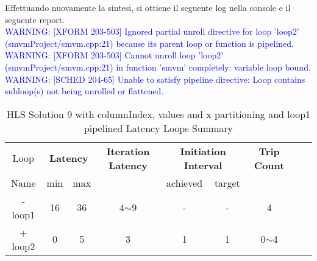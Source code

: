 

Effettuando nuovamente la sintesi, si ottiene il seguente log nella console e il seguente report.
\\
\textcolor{blue}{WARNING: [XFORM 203-503] Ignored partial unroll directive for loop 'loop2' (smvmProject/smvm.cpp:21) because its parent loop or function is pipelined.}
\\
\textcolor{blue}{WARNING: [XFORM 203-503] Cannot unroll loop 'loop2' (smvmProject/smvm.cpp:21) in function 'smvm' completely: variable loop bound.}
\\
\textcolor{blue}{WARNING: [SCHED 204-65] Unable to satisfy pipeline directive: Loop contains subloop(s) not being unrolled or flattened.}
\\
\begin{table}[H]
	\centering
	\begin{tabular}{|c|c|c|c|c|c|c|c|c|}
		\hline
		\multicolumn{1}{|c|}{Loop} & \multicolumn{2}{|c|}{\textbf{Latency}} & \multicolumn{1}{c|}{\textbf{Iteration Latency}} & \multicolumn{2}{c|}{\textbf{Initiation Interval}} & \multicolumn{1}{c|}{\textbf{Trip Count}}  \\
		Name & min & max &  & achieved & target &  \\
		\hline
		- loop1 & 16 & 36 & 4$\sim$9 & - & - & 4 \\
		+ loop2 & 0 & 5 & 3 & 1 & 1 & 0$\sim$4 \\
		\hline
	\end{tabular}
	\caption{HLS Solution 9 with columnIndex, values and x partitioning and loop1 pipelined Latency Loops Summary}
	\label{tab:hls-solution-9-columnindex-values-partitioning-loop-summary}
\end{table}

